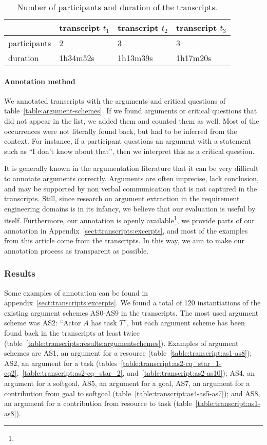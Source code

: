 \begin{table}[ht]
\centering
\begin{tabular}{|l|l|l|l|}
\hline
& transcript $t_1$ & transcript $t_2$ & transcript $t_3$\\
\hline
participants & 2 & 3 & 3\\
\hline
duration & 1h34m52s & 1h13m39s & 1h17m20s\\
\hline
\end{tabular}
\caption{Number of participants and duration of the transcripts.}
\label{table:transcripts:info}
\end{table}

\paragraph{Annotation method} We annotated transcripts with the arguments and critical questions of table~\ref{table:argument-schemes}. If we found arguments or critical questions that did not appear in the list, we added them and counted them as well. Most of the occurrences were not literally found back, but had to be inferred from the context. For instance, if a participant questions an argument with a statement such as ``I don't know about that'', then we interpret this as a critical question.

It is generally known in the argumentation literature that it can be very difficult to annotate arguments correctly. Arguments are often imprecise, lack conclusion, and may be supported by non verbal communication that is not captured in the transcripts. Still, since research on argument extraction in the requirement engineering domains is in its infancy, we believe that our evaluation is useful by itself. Furthermore, our annotation is openly available\footnote{}, we provide parts of our annotation in Appendix~\ref{sect:transcripts:excerpts}, and most of the examples from this article come from the transcripts. In this way, we aim to make our annotation process as transparent as possible.

\subsubsection{Results}

Some examples of annotation can be found in appendix~\ref{sect:transcripts:excerpts}. We found a total of 120 instantiations of the existing argument schemes AS0-AS9 in the transcripts. The most used argument scheme was AS2: ``Actor $A$ has task $T$'', but each argument scheme has been found back in the transcripts at least twice (table~\ref{table:transcripts:results:argumentschemes}). Examples of argument schemes are AS1, an argument for a resource (table~\ref{table:transcript:as1-as8}); AS2, an argument for a task (tables~\ref{table:transcript:as2-cq_star_1-cq2},~\ref{table:transcript:as2-cq_star_2}, and~\ref{table:transcript:as2-as10}); AS4, an argument for a softgoal, AS5, an argument for a goal, AS7, an argument for a contribution from goal to softgoal (table~\ref{table:transcript:as4-as5-as7}); and AS8, an argument for a contribution from resource to task (table~\ref{table:transcript:as1-as8}). 

